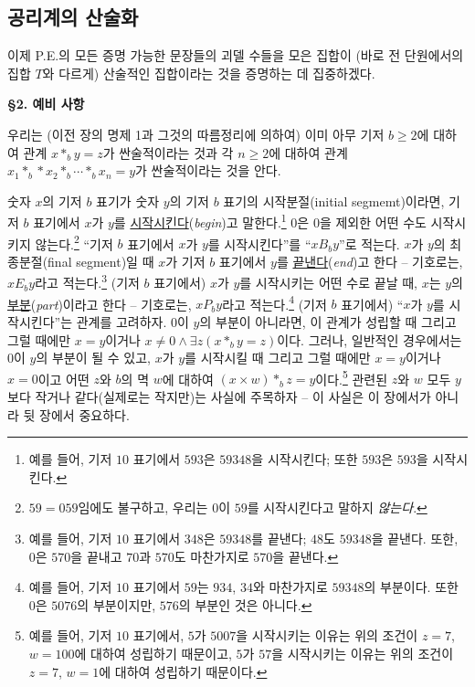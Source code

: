 \documentclass[12pt]{paper}
\begin{document}
\subsection{공리계의 산술화}
\hspace{12pt}

이제 P.E.의 모든 증명 가능한 문장들의 괴델 수들을 모은 집합이 (바로 전 단원에서의 집합 $T$와 다르게) 산술적인 집합이라는 것을 증명하는 데 집중하겠다.

\noindent \textbf{\S2. 예비 사항}

우리는 (이전 장의 명제 1과 그것의 따름정리에 의하여)
이미 아무 기저 $ b \ge 2 $에 대하여 관계 $ x *_{b} y = z $가 싼술적이라는 것과
각 $n \ge 2$에 대하여 관계 $ x_1 *_{b} * x_2 *_{b} \cdots *_{b} x_n = y $가 싼술적이라는 것을 안다.

숫자 $x$의 기저 $b$ 표기가 숫자 $y$의 기저 $b$ 표기의 시작분절(initial segmemt)이라면,
기저 $b$ 표기에서 $x$가 $y$를 \underline{시작시킨다}(\textit{begin})고 말한다.\footnote
{
예를 들어, 기저 $10$ 표기에서 $593$은 $59348$을 시작시킨다; 또한 $593$은 $593$을 시작시킨다.
}
$0$은 $0$을 제외한 어떤 수도 시작시키지 않는다.\footnote
{
$59 = 059$임에도 불구하고, 우리는 $0$이 $59$를 시작시킨다고 말하지 \textit{않는다}.
}
``기저 $b$ 표기에서 $x$가 $y$를 시작시킨다''를 ``$x B_{b} y$''로 적는다.
$x$가 $y$의 최종분절(final segment)일 때 $x$가 기저 $b$ 표기에서 $y$를 \underline{끝낸다}(\textit{end})고 한다 -- 기호로는, $x E_{b} y$라고 적는다.\footnote
{
예를 들어, 기저 $10$ 표기에서 $348$은 $59348$를 끝낸다; $48$도 $59348$을 끝낸다.
또한, $0$은 $570$을 끝내고 $70$과 $570$도 마찬가지로 $570$을 끝낸다.
}
(기저 $b$ 표기에서) $x$가 $y$를 시작시키는 어떤 수로 끝날 때, $x$는 $y$의 \underline{부분}(\textit{part})이라고 한다 -- 기호로는, $x P_{b} y$라고 적는다.\footnote
{
예를 들어, 기저 $10$ 표기에서 $59$는 $934$, $34$와 마찬가지로 $59348$의 부분이다.
또한 $0$은 $5076$의 부분이지만, $576$의 부분인 것은 아니다.
}
(기저 $b$ 표기에서) ``$x$가 $y$를 시작시킨다''는 관계를 고려하자.
$0$이 $y$의 부분이 아니라면, 이 관계가 성립할 때 그리고 그럴 때에만 $x = y$이거나 $x \ne 0 \land \exists z \left( x *_{b} y = z \right)$이다.
그러나, 일반적인 경우에서는 $0$이 $y$의 부분이 될 수 있고, $x$가 $y$를 시작시킬 때 그리고 그럴 때에만 $x = y$이거나 $x = 0$이고 어떤 $z$와 $b$의 멱 $w$에 대하여 $\left( x \times w \right) *_{b} z = y$이다.\footnote
{
예를 들어, 기저 $10$ 표기에서, $5$가 $5007$을 시작시키는 이유는 위의 조건이 $z = 7$, $w = 100$에 대하여 성립하기 때문이고,
$5$가 $57$을 시작시키는 이유는 위의 조건이 $z = 7$, $w = 1$에 대하여 성립하기 때문이다.
}
관련된 $z$와 $w$ 모두 $y$보다 작거나 같다(실제로는 작지만)는 사실에 주목하자 -- 이 사실은 이 장에서가 아니라 뒷 장에서 중요하다.
\end{document}

